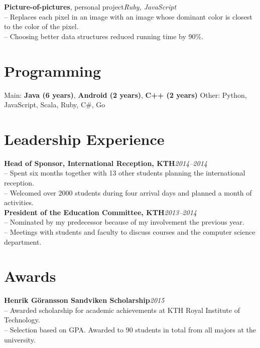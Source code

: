 \documentclass[10pt]{article}
\begin{document}
\noindent\textbf{Picture-of-pictures}, personal project\hfill \textit{Ruby, JavaScript} \\
\indent-- Replaces each pixel in an image with an image whose dominant color is closest to the color of the pixel.\\
\indent-- Choosing better data structures reduced running time by 90\%. \\

\section*{Programming}
\vspace{0.1em}
\hline
\vspace{0.3em}
\indent Main: \textbf{Java (6 years)}, \textbf{Android (2 years)}, \textbf{C++ (2 years)}\hspace{2em} Other: Python, JavaScript, Scala, Ruby, C\#, Go\\

\section*{Leadership Experience}
\vspace{0.1em}
\hline
\vspace{0.3em}
\noindent\textbf{Head of Sponsor, International Reception, KTH}\hfill\textit{2014--2014} \\
\indent-- Spent six months together with 13 other students planning the international reception.\\
\indent-- Welcomed over 2000 students during four arrival days and planned a month of activities. \\

\noindent\textbf{President of the Education Committee, KTH}\hfill\textit{2013--2014} \\
\indent-- Nominated by my predecessor because of my involvement the previous year.\\
\indent-- Meetings with students and faculty to discuss courses and the computer science department.\\

\section*{Awards}
\vspace{0.1em}
\hline
\vspace{0.3em}
\textbf{Henrik Göransson Sandviken Scholarship}\hfill\textit{2015}\\
\indent-- Awarded scholarship for academic achievements at KTH Royal Institute of Technology.\\
\indent-- Selection based on GPA. Awarded to 90 students in total from all majors at the university.\\
\end{document}
